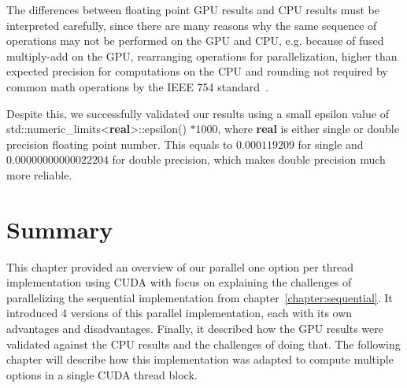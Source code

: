 The differences between floating point GPU results and CPU results must be interpreted carefully, since there are many reasons why the same sequence of operations may not be performed on the GPU and CPU, e.g. because of fused multiply-add on the GPU, rearranging operations for parallelization, higher than expected precision for computations on the CPU and rounding not required by common math operations by the IEEE 754 standard~\cite[pg. 16]{whitehead2018}.

Despite this, we successfully validated our results using a small epsilon value of std::numeric\_limits<\textbf{real}>::epsilon() $* 1000$,
where \textbf{real} is either single or double precision floating point number. This equals to $0.000119209$ for single and $0.00000000000022204$ for double precision, which makes double precision much more reliable.

\section*{Summary}
This chapter provided an overview of our parallel one option per thread implementation using CUDA with focus on explaining the challenges of parallelizing the sequential implementation from chapter~\ref{chapter:sequential}. It introduced 4 versions of this parallel implementation, each with its own advantages and disadvantages. Finally, it described how the GPU results were validated against the CPU results and the challenges of doing that. The following chapter will describe how this implementation was adapted to compute multiple options in a single CUDA thread block.

